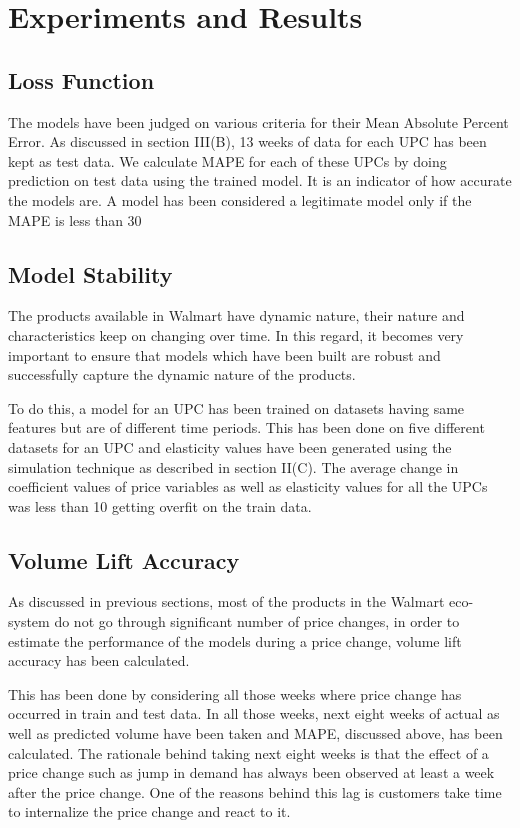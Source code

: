 \section{Experiments and Results}
\label{sec:eval}

\subsection{Loss Function}
The models have been judged on various criteria for their Mean Absolute Percent Error.
As discussed in section III(B), 13 weeks of data for each UPC has been kept as test data. We calculate MAPE for each of
these UPCs by doing prediction on test data using the trained model. It is an indicator of how accurate the models are. 
A model has been considered a legitimate model only if the MAPE is less than 30%

\subsection{Model Stability} 
The products available in Walmart have dynamic nature, their nature and characteristics keep on changing over time. 
In this regard, it becomes very important to ensure that models which have been built are robust and successfully 
capture the dynamic nature of the products. 

To do this, a model for an UPC has been trained on datasets having same features but are of different time periods. 
This has been done on five different datasets for an UPC and elasticity values have been generated using the simulation 
technique as described in section II(C). The average change in coefficient values of price variables as well as elasticity 
values for all the UPCs was less than 10%
getting overfit on the train data. 

\subsection{Volume Lift Accuracy}  
As discussed in previous sections, most of the products in the Walmart eco-system do not go through significant 
number of price changes, in order to estimate the performance of the models during a price change, volume lift 
accuracy has been calculated. 

This has been done by considering all those weeks where     
price change has occurred in train and test data. In all those weeks, next eight weeks of actual 
as well as predicted volume have been taken and MAPE, discussed above, has been calculated. The rationale behind
taking next eight weeks is that the effect of a price change such as jump in demand has always been observed at 
least a week after the price change. One of the reasons behind this lag is customers take time to internalize the price 
change and react to it.

